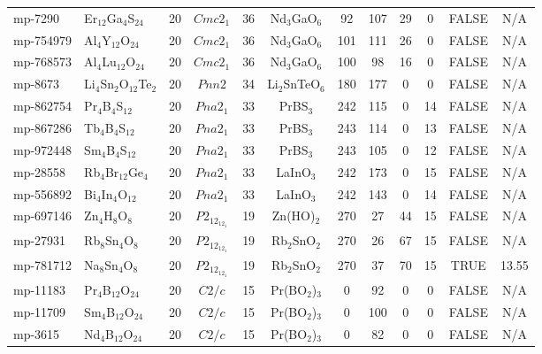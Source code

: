 {\begin{longtable}{llcccccccccc}
    mp-7290 & Er$_{12}$Ga$_{4}$S$_{24}$ & 20    & $Cmc2_1$ & 36    & Nd$_{3}$GaO$_{6}$ & 92    & 107   & 29    & 0     & FALSE & N/A \\
    mp-754979 & Al$_{4}$Y$_{12}$O$_{24}$ & 20    & $Cmc2_1$ & 36    & Nd$_{3}$GaO$_{6}$ & 101   & 111   & 26    & 0     & FALSE & N/A \\
    mp-768573 & Al$_{4}$Lu$_{12}$O$_{24}$ & 20    & $Cmc2_1$ & 36    & Nd$_{3}$GaO$_{6}$ & 100   & 98    & 16    & 0     & FALSE & N/A \\
    mp-8673 & Li$_{4}$Sn$_{2}$O$_{12}$Te$_{2}$ & 20    & $Pnn2$ & 34    & Li$_{2}$SnTeO$_{6}$ & 180   & 177   & 0     & 0     & FALSE & N/A \\
    mp-862754 & Pr$_{4}$B$_{4}$S$_{12}$ & 20    & $Pna2_1$ & 33    & PrBS$_{3}$ & 242   & 115   & 0     & 14    & FALSE & N/A \\
    mp-867286 & Tb$_{4}$B$_{4}$S$_{12}$ & 20    & $Pna2_1$ & 33    & PrBS$_{3}$ & 243   & 114   & 0     & 13    & FALSE & N/A \\
    mp-972448 & Sm$_{4}$B$_{4}$S$_{12}$ & 20    & $Pna2_1$ & 33    & PrBS$_{3}$ & 243   & 105   & 0     & 12    & FALSE & N/A \\
    mp-28558 & Rb$_{4}$Br$_{12}$Ge$_{4}$ & 20    & $Pna2_1$ & 33    & LaInO$_{3}$ & 242   & 173   & 0     & 15    & FALSE & N/A \\
    mp-556892 & Bi$_{4}$In$_{4}$O$_{12}$ & 20    & $Pna2_1$ & 33    & LaInO$_{3}$ & 242   & 143   & 0     & 14    & FALSE & N/A \\
    mp-697146 & Zn$_{4}$H$_{8}$O$_{8}$ & 20    & $P2_12_12_1$ & 19    & Zn(HO)$_{2}$ & 270   & 27    & 44    & 15    & FALSE & N/A \\
    mp-27931 & Rb$_{8}$Sn$_{4}$O$_{8}$ & 20    & $P2_12_12_1$ & 19    & Rb$_{2}$SnO$_{2}$ & 270   & 26    & 67    & 15    & FALSE & N/A \\
    mp-781712 & Na$_{8}$Sn$_{4}$O$_{8}$ & 20    & $P2_12_12_1$ & 19    & Rb$_{2}$SnO$_{2}$ & 270   & 37    & 70    & 15    & TRUE  & 13.55  \\
    mp-11183 & Pr$_{4}$B$_{12}$O$_{24}$ & 20    & $C2/c$ & 15    & Pr(BO$_{2}$)$_{3}$ & 0     & 92    & 0     & 0     & FALSE & N/A \\
    mp-11709 & Sm$_{4}$B$_{12}$O$_{24}$ & 20    & $C2/c$ & 15    & Pr(BO$_{2}$)$_{3}$ & 0     & 100   & 0     & 0     & FALSE & N/A \\
    mp-3615 & Nd$_{4}$B$_{12}$O$_{24}$ & 20    & $C2/c$ & 15    & Pr(BO$_{2}$)$_{3}$ & 0     & 82    & 0     & 0     & FALSE & N/A \\

\end{longtable}}
